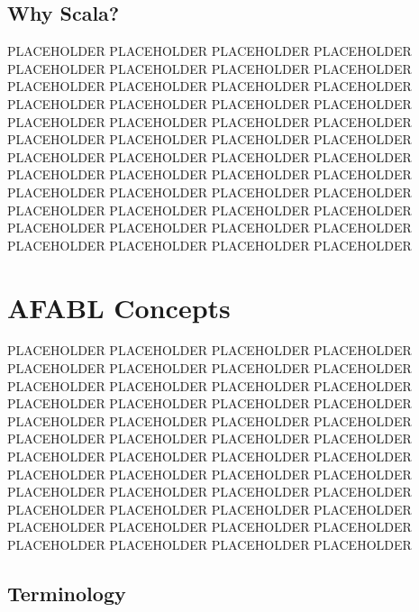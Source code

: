 \subsection{Why Scala?}

PLACEHOLDER PLACEHOLDER PLACEHOLDER PLACEHOLDER PLACEHOLDER PLACEHOLDER PLACEHOLDER PLACEHOLDER PLACEHOLDER PLACEHOLDER PLACEHOLDER PLACEHOLDER PLACEHOLDER PLACEHOLDER PLACEHOLDER PLACEHOLDER PLACEHOLDER PLACEHOLDER PLACEHOLDER PLACEHOLDER PLACEHOLDER PLACEHOLDER PLACEHOLDER PLACEHOLDER PLACEHOLDER PLACEHOLDER PLACEHOLDER PLACEHOLDER PLACEHOLDER PLACEHOLDER PLACEHOLDER PLACEHOLDER PLACEHOLDER PLACEHOLDER PLACEHOLDER PLACEHOLDER PLACEHOLDER PLACEHOLDER PLACEHOLDER PLACEHOLDER PLACEHOLDER PLACEHOLDER PLACEHOLDER PLACEHOLDER PLACEHOLDER PLACEHOLDER PLACEHOLDER PLACEHOLDER

\section{AFABL Concepts}

PLACEHOLDER PLACEHOLDER PLACEHOLDER PLACEHOLDER PLACEHOLDER PLACEHOLDER PLACEHOLDER PLACEHOLDER PLACEHOLDER PLACEHOLDER PLACEHOLDER PLACEHOLDER PLACEHOLDER PLACEHOLDER PLACEHOLDER PLACEHOLDER PLACEHOLDER PLACEHOLDER PLACEHOLDER PLACEHOLDER PLACEHOLDER PLACEHOLDER PLACEHOLDER PLACEHOLDER PLACEHOLDER PLACEHOLDER PLACEHOLDER PLACEHOLDER PLACEHOLDER PLACEHOLDER PLACEHOLDER PLACEHOLDER PLACEHOLDER PLACEHOLDER PLACEHOLDER PLACEHOLDER PLACEHOLDER PLACEHOLDER PLACEHOLDER PLACEHOLDER PLACEHOLDER PLACEHOLDER PLACEHOLDER PLACEHOLDER PLACEHOLDER PLACEHOLDER PLACEHOLDER PLACEHOLDER

\subsection{Terminology}

